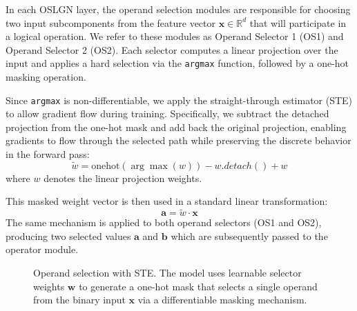 In each OSLGN layer, the operand selection modules are responsible for choosing two input subcomponents from the feature vector $\mathbf{x} \in \mathbb{R}^d$ that will participate in a logical operation. We refer to these modules as Operand Selector 1 (OS1) and Operand Selector 2 (OS2). Each selector computes a linear projection over the input and applies a hard selection via the \texttt{argmax} function, followed by a one-hot masking operation.

Since \texttt{argmax} is non-differentiable, we apply the straight-through estimator (STE) to allow gradient flow during training. Specifically, we subtract the detached projection from the one-hot mask and add back the original projection, enabling gradients to flow through the selected path while preserving the discrete behavior in the forward pass:
\[
\tilde{w} = \text{onehot}(\arg\max(w)) - w.detach() + w
\]
where $w$ denotes the linear projection weights.

This masked weight vector is then used in a standard linear transformation:
\[
\mathbf{a} = \tilde{w} \cdot \mathbf{x}
\]
The same mechanism is applied to both operand selectors (OS1 and OS2), producing two selected values $\mathbf{a}$ and $\mathbf{b}$ which are subsequently passed to the operator module.

\begin{figure}[H]
    \centering
    \caption{
    Operand selection with STE. The model uses learnable selector weights $\mathbf{w}$ to generate a one-hot mask that selects a single operand from the binary input $\mathbf{x}$ via a differentiable masking mechanism.
    }
    \label{fig:operand-selection-ste}
\end{figure}

